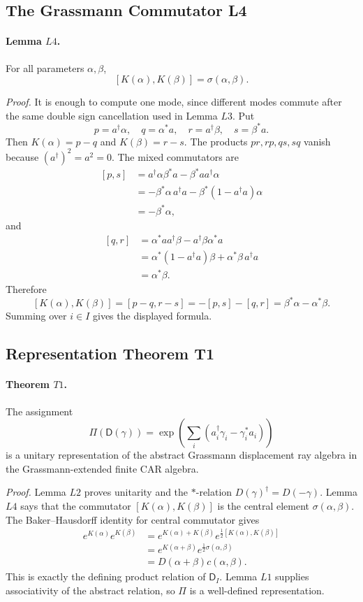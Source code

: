 \subsection{The Grassmann Commutator L4}

\paragraph{Lemma \(L4\).}
For all parameters \(\alpha,\beta\),
\[
  [K(\alpha),K(\beta)]=\sigma(\alpha,\beta).
\]

\emph{Proof.}
It is enough to compute one mode, since different modes commute after the same
double sign cancellation used in Lemma \(L3\).  Put
\[
  p=a^\dagger\alpha,\quad q=\alpha^*a,\quad
  r=a^\dagger\beta,\quad s=\beta^*a .
\]
Then \(K(\alpha)=p-q\) and \(K(\beta)=r-s\).  The products \(pr,rp,qs,sq\)
vanish because \((a^\dagger)^2=a^2=0\).  The mixed commutators are
\[
\begin{aligned}
 [p,s]
 &=a^\dagger\alpha\beta^*a-\beta^*aa^\dagger\alpha\\
 &=-\beta^*\alpha\,a^\dagger a-\beta^*(1-a^\dagger a)\alpha\\
 &=-\beta^*\alpha,
\end{aligned}
\]
and
\[
\begin{aligned}
 [q,r]
 &=\alpha^*aa^\dagger\beta-a^\dagger\beta\alpha^*a\\
 &=\alpha^*(1-a^\dagger a)\beta+\alpha^*\beta\,a^\dagger a\\
 &=\alpha^*\beta .
\end{aligned}
\]
Therefore
\[
  [K(\alpha),K(\beta)]
  =
  [p-q,r-s]
  =
  -[p,s]-[q,r]
  =
  \beta^*\alpha-\alpha^*\beta .
\]
Summing over \(i\in I\) gives the displayed formula.

\subsection{Representation Theorem T1}

\paragraph{Theorem \(T1\).}
The assignment
\[
  \Pi(\mathsf D(\gamma))=
  \exp\!\left(\sum_i(a_i^\dagger\gamma_i-\gamma_i^*a_i)\right)
\]
is a unitary representation of the abstract Grassmann displacement ray algebra
in the Grassmann-extended finite CAR algebra.

\emph{Proof.}
Lemma \(L2\) proves unitarity and the \(*\)-relation
\(D(\gamma)^\dagger=D(-\gamma)\).  Lemma \(L4\) says that the commutator
\([K(\alpha),K(\beta)]\) is the central element \(\sigma(\alpha,\beta)\).
The Baker--Hausdorff identity for central commutator gives
\[
\begin{aligned}
  e^{K(\alpha)}e^{K(\beta)}
  &=
  e^{K(\alpha)+K(\beta)}
  e^{\frac12[K(\alpha),K(\beta)]}\\
  &=
  e^{K(\alpha+\beta)}
  e^{\frac12\sigma(\alpha,\beta)}\\
  &=
  D(\alpha+\beta)c(\alpha,\beta).
\end{aligned}
\]
This is exactly the defining product relation of \(\mathsf D_I\).  Lemma
\(L1\) supplies associativity of the abstract relation, so \(\Pi\) is a
well-defined representation.

